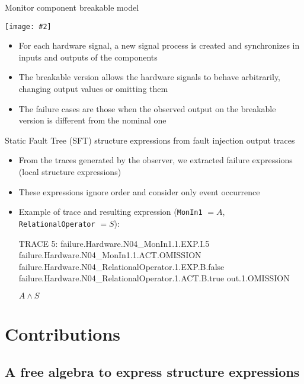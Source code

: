 \documentclass{beamer}
\def\SFT{%
	Static Fault Tree (SFT)%
	\gdef\SFT{SFT\xspace}%
	\gdef\SFTs{SFTs\xspace}%
	\xspace%
}
\def\SFTs{%
	Static Fault Trees (SFTs)%
	\gdef\SFT{SFT\xspace}%
	\gdef\SFTs{SFTs\xspace}%
	\xspace%
}
\newcommand{\includegraphicsaspectratio}[2][1]{%
  \texttt{[image: \#2]}%
}
\newenvironment{snippetcspm}[1][2]
{
\ifthenelse{\equal{#1}{0}}
    {\tiny}
    {
    \ifthenelse{\equal{#1}{1}}
        {\scriptsize}
        {
        \ifthenelse{\equal{#1}{2}}
            {\footnotesize}
            {\small}
        }
    }
\verbatim
}
{
\endverbatim
}
\begin{document}
\begin{frame}[fragile]{Monitor component breakable model}
	\footnotesize
	\begin{center}
		\includegraphicsaspectratio[0.60]{monitor-breakable}
	\end{center}
	\begin{itemize}
		\item For each hardware signal, a new signal process is created and synchronizes in inputs and outputs of the components
		\item The breakable version allows the hardware signals to behave arbitrarily, changing output values or omitting them
		\item The failure cases are those when the observed output on the breakable version is different from the nominal one
	\end{itemize}
\end{frame}

\begin{frame}[fragile]{\SFT structure expressions from fault injection output traces}
	\begin{itemize}
		\item From the traces generated by the observer, we extracted failure expressions (local structure expressions)
		\item These expressions ignore order and consider only event occurrence
		\item Example of trace and resulting expression (\verb$MonIn1$ $=A$, \verb$RelationalOperator$ $=S$):
		\begin{snippetcspm}[1]
			TRACE 5:
			failure.Hardware.N04_MonIn1.1.EXP.I.5
			failure.Hardware.N04_MonIn1.1.ACT.OMISSION
			failure.Hardware.N04_RelationalOperator.1.EXP.B.false
			failure.Hardware.N04_RelationalOperator.1.ACT.B.true
			out.1.OMISSION
		\end{snippetcspm}
		$A \land S$
	\end{itemize}
\end{frame}

\section{Contributions}
\subsection{A free algebra to express structure expressions}
\end{document}
